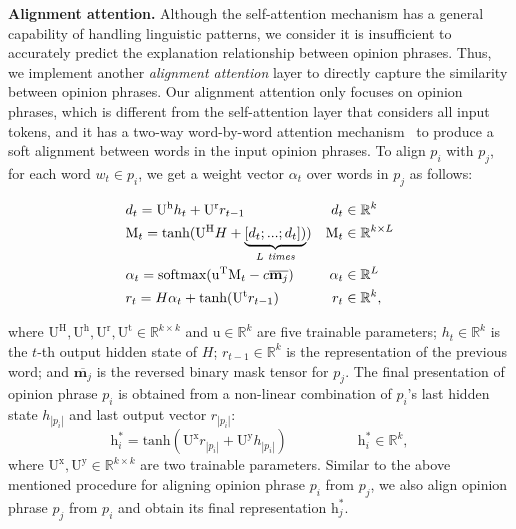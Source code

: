\smallskip
\noindent \textbf{Alignment attention. }
Although the self-attention mechanism has a general capability of handling linguistic patterns, we consider it is insufficient to accurately predict the explanation relationship between opinion phrases. Thus, we implement another {\it alignment attention} layer to directly capture the similarity between opinion phrases.
Our alignment attention only focuses on opinion phrases, which is different from the self-attention layer that considers all input tokens, and it has a two-way word-by-word attention mechanism~\cite{rocktaschel2015reasoning} to produce a soft alignment between words in the input opinion phrases. To align $p_i$ with $p_j$, for each word $w_t\in p_i$, we get a weight vector $\alpha_t$ over words in $p_j$ as follows:

\begin{align}
& d_t = \mathrm{U}^\mathrm{h} h_t + \mathrm{U}^\mathrm{r} r_{t-1} & d_t & \in \mathbb{R}^{k}\\
& \mathrm{M}_t = \text{tanh}(\mathrm{U}^\mathrm{H} H + \underbrace{[d_t;...;d_t])}_{L \text{\em\ times}}) & \mathrm{M}_t& \in  \mathbb{R}^{k\times L}\\
& \alpha_t = \text{softmax}(\mathrm{u}^\mathrm{T} \mathrm{M}_t - c \overline{\mathbf{m}_j}) &  \alpha_t &\in \mathbb{R}^{L}\\
& r_t = H \alpha_t + \text{tanh}(\mathrm{U}^\mathrm{t} r_{t-1}) &  r_t &\in \mathbb{R}^{k},
\end{align}

where $\mathrm{U}^\mathrm{H}, \mathrm{U}^\mathrm{h}, \mathrm{U}^\mathrm{r}, \mathrm{U}^\mathrm{t} \in \mathbb{R}^{k\times k}$ and $\mathrm{u} \in \mathbb{R}^{k}$ are five trainable parameters; $h_t \in \mathbb{R}^{k}$ is the $t$-th output hidden state of $H$; $r_{t-1} \in \mathbb{R}^{k}$ is the representation of the previous word; and $\overline{\textbf{m}_j}$ is the reversed binary mask tensor for $p_j$. The final presentation of opinion phrase $p_i$ is obtained from a non-linear combination of $p_i$'s last hidden state $h_{|p_i|}$ and last output vector $r_{|p_i|}$:
\begin{equation}
    \mathrm{h}_i^* = \text{tanh}(\mathrm{U}^{\mathrm{x}} r_{|p_i|} + \mathrm{U}^{\mathrm{y}} h_{|p_i|}) \qquad\qquad\quad \mathrm{h}_i^* \in \mathbb{R}^{k},
\end{equation}
%
where $\mathrm{U}^{\mathrm{x}}, \mathrm{U}^{\mathrm{y}} \in \mathbb{R}^{k\times k}$ are two trainable parameters. 
Similar to the above mentioned procedure for aligning opinion phrase $p_i$ from $p_j$, we also align opinion phrase $p_j$ from $p_i$ and obtain its final representation $\mathrm{h}_j^*$.



